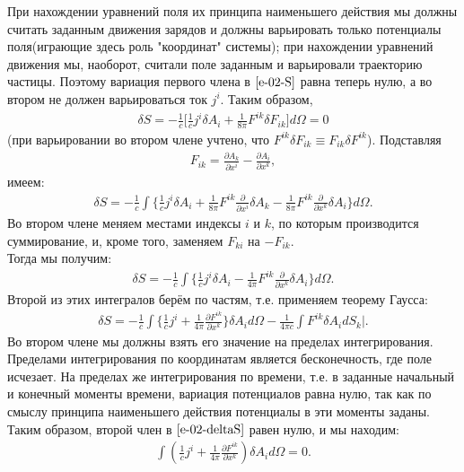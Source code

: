 При нахождении уравнений поля их принципа наименьшего действия мы должны считать заданным движения зарядов и должны варьировать только потенциалы поля(играющие здесь роль "координат" системы); при нахождении уравнений движения мы, наоборот, считали поле заданным и варьировали траекторию частицы.
Поэтому вариация первого члена в $\ref{e-02-S}$ равна теперь нулю, а во втором не должен варьироваться ток $j^i$. Таким образом, 
\begin{gather*}
	\delta S = -\frac{1}{c}\big[\frac{1}{c}j^i\delta A_i + \frac{1}{8\pi}F^{ik}\delta F_{ik}\big]d\Omega = 0
\end{gather*}
(при варьировании во втором члене учтено, что $F^{ik}\delta F_{ik} \equiv F_{ik}\delta F^{ik}$). Подставляя
\begin{gather*}
	F_{ik} = \frac{\partial A_k}{\partial x^i} - \frac{\partial A_i}{\partial x^k},
\end{gather*}
имеем:
\begin{gather*}
	\delta S = -\frac{1}{c}\int \big\{\frac{1}{c}j^i\delta A_i + \frac{1}{8\pi}F^{ik}\frac{\partial}{\partial x^i}\delta A_k - \frac{1}{8\pi}F^{ik}\frac{\partial}{\partial x^k}\delta A_i\big\}d\Omega.
\end{gather*}
Во втором члене меняем местами индексы $i$ и $k$, по которым производится суммирование, и, кроме того, заменяем $F_{ki}$ на $-F_{ik}$.\\
Тогда мы получим:
\begin{gather*}
	\delta S = -\frac{1}{c}\int\big\{\frac{1}{c}j^i\delta A_i - \frac{1}{4\pi}F^{ik}\frac{\partial}{\partial x^k}\delta A_i\big\}d\Omega.
\end{gather*}
Второй из этих интегралов берём по частям, т.е. применяем теорему Гаусса:
\begin{gather}
	\label{e-02-deltaS}
	\delta S = -\frac{1}{c}\int\big\{\frac{1}{c}j^i + \frac{1}{4\pi}\frac{\partial F^{ik}}{\partial x^k}\big\}\delta A_id\Omega - \frac{1}{4\pi c}\int F^{ik}\delta A_idS_k\big|.
\end{gather}
Во втором члене  мы должны взять его значение на пределах интегрирования. Пределами интегрирования по координатам является бесконечность, где поле исчезает. На пределах же интегрирования по времени, т.е. в заданные начальный и конечный моменты времени, вариация потенциалов равна нулю, так как по смыслу принципа наименьшего действия потенциалы в эти моменты заданы. Таким образом, второй член в $\ref{e-02-deltaS}$ равен нулю, и мы находим:
\begin{gather*}
	\int(\frac{1}{c}j^i + \frac{1}{4\pi}\frac{\partial F^{ik}}{\partial x^k})\delta A_id\Omega = 0.
\end{gather*}
